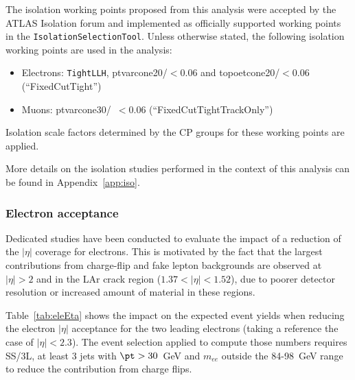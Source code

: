The isolation working points proposed from this analysis were accepted by the ATLAS Isolation forum and implemented as officially supported working points in the {\tt IsolationSelectionTool}. Unless otherwise stated, the following isolation working points are used in the analysis:
\begin{itemize}
\item Electrons: {\tt TightLLH}, ptvarcone20/\pt$<$0.06 and topoetcone20/\pt$<$0.06 (``FixedCutTight'')
\item Muons: ptvarcone30/\pt\ $<0.06$ (``FixedCutTightTrackOnly'')
\end{itemize}
Isolation scale factors determined by the CP groups for these working points are applied. 

More details on the isolation studies performed in the context of this analysis can be found in Appendix~\ref{app:iso}.



\subsubsection{Electron acceptance}
\label{sec:eleAcceptance}

Dedicated studies have been conducted to evaluate the impact of a reduction of the $|\eta|$ coverage for electrons. 
This is motivated by the fact that the largest contributions from charge-flip and fake lepton backgrounds 
are observed at $|\eta|>2$ and in the LAr crack region ($1.37<|\eta|<1.52$), 
due to poorer detector resolution or increased amount of material in these regions. 

Table~\ref{tab:eleEta} shows the impact on the expected event yields when reducing the electron $|\eta|$ acceptance 
for the two leading electrons (taking a reference the case of $|\eta|<2.3$). The event selection applied to compute those numbers 
requires SS/3L, at least 3 jets with $\pt > 30$~GeV and $m_{ee}$ outside the 84-98~GeV range to reduce the contribution 
from charge flips. 

